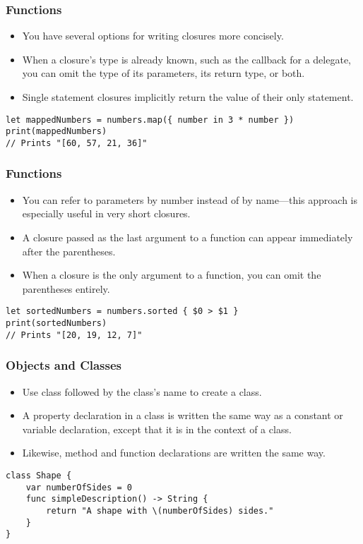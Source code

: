 \begin{frame}[fragile] \frametitle{Functions}
\begin{itemize}
\item You have several options for writing closures more concisely. 
\item When a closure’s type is already known, such as the callback for a delegate, you can omit the type of its parameters, its return type, or both. 
\item Single statement closures implicitly return the value of their only statement.
\end{itemize}

\begin{lstlisting}[basicstyle=\scriptsize]
let mappedNumbers = numbers.map({ number in 3 * number })
print(mappedNumbers)
// Prints "[60, 57, 21, 36]"
\end{lstlisting}

\end{frame}

\begin{frame}[fragile] \frametitle{Functions}
\begin{itemize}
\item You can refer to parameters by number instead of by name—this approach is especially useful in very short closures. 
\item A closure passed as the last argument to a function can appear immediately after the parentheses. 
\item When a closure is the only argument to a function, you can omit the parentheses entirely.
\end{itemize}

\begin{lstlisting}[basicstyle=\scriptsize]
let sortedNumbers = numbers.sorted { $0 > $1 }
print(sortedNumbers)
// Prints "[20, 19, 12, 7]"
\end{lstlisting}

\end{frame}

\begin{frame}[fragile] \frametitle{Objects and Classes}
\begin{itemize}
\item Use class followed by the class’s name to create a class. 
\item A property declaration in a class is written the same way as a constant or variable declaration, except that it is in the context of a class. 
\item Likewise, method and function declarations are written the same way.
\end{itemize}

\begin{lstlisting}[basicstyle=\scriptsize]
class Shape {
    var numberOfSides = 0
    func simpleDescription() -> String {
        return "A shape with \(numberOfSides) sides."
    }
}
\end{lstlisting}

\end{frame}

